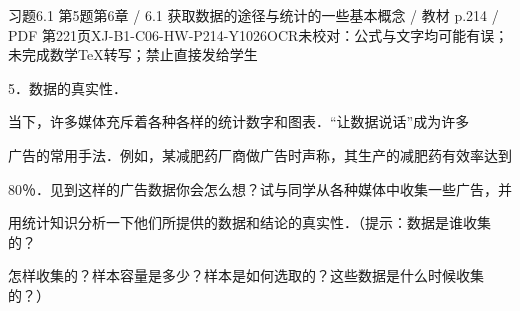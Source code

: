 \begin{bankitem}{习题6.1 第5题}{第6章 / 6.1 获取数据的途径与统计的一些基本概念 / 教材 p.214 / PDF 第221页}{XJ-B1-C06-HW-P214-Y1026}{OCR未校对：公式与文字均可能有误；未完成数学TeX转写；禁止直接发给学生}
\begin{ocrdraft}
\par
5．数据的真实性．
\par
当下，许多媒体充斥着各种各样的统计数字和图表．“让数据说话”成为许多
\par
广告的常用手法．例如，某减肥药厂商做广告时声称，其生产的减肥药有效率达到
\par
80％．见到这样的广告数据你会怎么想？试与同学从各种媒体中收集一些广告，并
\par
用统计知识分析一下他们所提供的数据和结论的真实性．（提示：数据是谁收集的？
\par
怎样收集的？样本容量是多少？样本是如何选取的？这些数据是什么时候收集的？）
\end{ocrdraft}
\end{bankitem}
